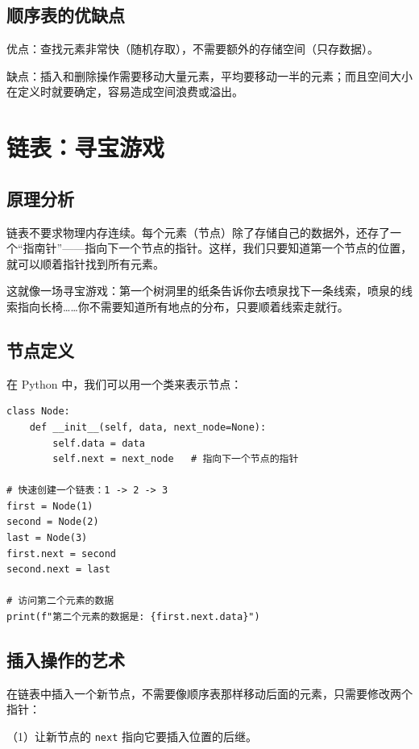\subsection{顺序表的优缺点}

优点：查找元素非常快（随机存取），不需要额外的存储空间（只存数据）。

缺点：插入和删除操作需要移动大量元素，平均要移动一半的元素；而且空间大小在定义时就要确定，容易造成空间浪费或溢出。


\section{链表：寻宝游戏}

\subsection{原理分析}

链表不要求物理内存连续。每个元素（节点）除了存储自己的数据外，还存了一个“指南针”——指向下一个节点的指针。这样，我们只要知道第一个节点的位置，就可以顺着指针找到所有元素。

这就像一场寻宝游戏：第一个树洞里的纸条告诉你去喷泉找下一条线索，喷泉的线索指向长椅……你不需要知道所有地点的分布，只要顺着线索走就行。

\subsection{节点定义}

在 Python 中，我们可以用一个类来表示节点：

\begin{verbatim}
class Node:
    def __init__(self, data, next_node=None):
        self.data = data
        self.next = next_node   # 指向下一个节点的指针

# 快速创建一个链表：1 -> 2 -> 3
first = Node(1)
second = Node(2)
last = Node(3)
first.next = second
second.next = last

# 访问第二个元素的数据
print(f"第二个元素的数据是: {first.next.data}")
\end{verbatim}

\subsection{插入操作的艺术}

在链表中插入一个新节点，不需要像顺序表那样移动后面的元素，只需要修改两个指针：

（1）让新节点的 \texttt{next} 指向它要插入位置的后继。

